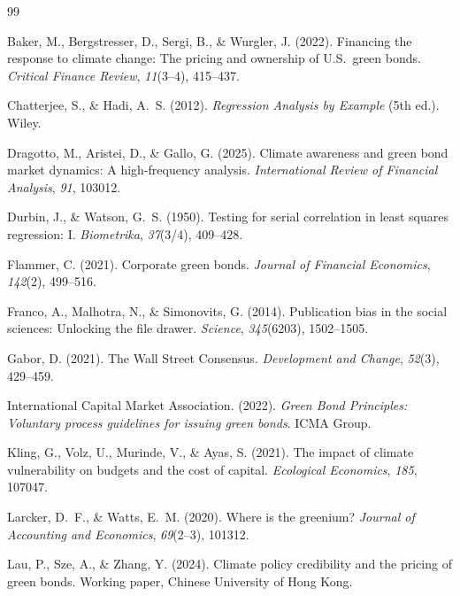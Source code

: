 \documentclass[12pt,a4paper]{article}
\begin{document}
\begin{thebibliography}{99}

Baker, M., Bergstresser, D., Sergi, B., \& Wurgler, J. (2022).
Financing the response to climate change: The pricing and ownership of U.S.\ green bonds.
\textit{Critical Finance Review}, \textit{11}(3--4), 415--437.

Chatterjee, S., \& Hadi, A.~S. (2012).
\textit{Regression Analysis by Example} (5th ed.).
Wiley.

Dragotto, M., Aristei, D., \& Gallo, G. (2025).
Climate awareness and green bond market dynamics: A high-frequency analysis.
\textit{International Review of Financial Analysis}, \textit{91}, 103012.

Durbin, J., \& Watson, G.~S. (1950).
Testing for serial correlation in least squares regression: I.
\textit{Biometrika}, \textit{37}(3/4), 409--428.

Flammer, C. (2021).
Corporate green bonds.
\textit{Journal of Financial Economics}, \textit{142}(2), 499--516.

Franco, A., Malhotra, N., \& Simonovits, G. (2014).
Publication bias in the social sciences: Unlocking the file drawer.
\textit{Science}, \textit{345}(6203), 1502--1505.

Gabor, D. (2021).
The Wall Street Consensus.
\textit{Development and Change}, \textit{52}(3), 429--459.

International Capital Market Association. (2022).
\textit{Green Bond Principles: Voluntary process guidelines for issuing green bonds}.
ICMA Group.

Kling, G., Volz, U., Murinde, V., \& Ayas, S. (2021).
The impact of climate vulnerability on budgets and the cost of capital.
\textit{Ecological Economics}, \textit{185}, 107047.

Larcker, D.~F., \& Watts, E.~M. (2020).
Where is the greenium?
\textit{Journal of Accounting and Economics}, \textit{69}(2--3), 101312.

Lau, P., Sze, A., \& Zhang, Y. (2024).
Climate policy credibility and the pricing of green bonds.
Working paper, Chinese University of Hong Kong.


\end{thebibliography}
\end{document}
